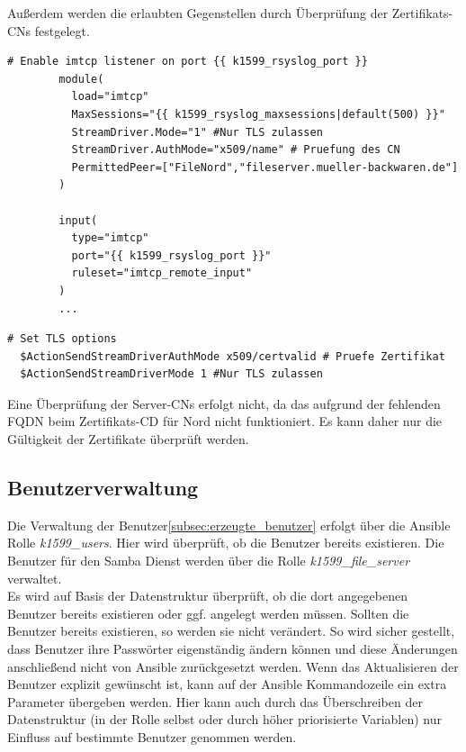 Außerdem werden die erlaubten Gegenstellen durch Überprüfung der Zertifikats-CNs festgelegt.

\begin{lstlisting}[label=code:syslog3,caption=Whitelisting der CN]
        # Enable imtcp listener on port {{ k1599_rsyslog_port }}
        module(
          load="imtcp"
          MaxSessions="{{ k1599_rsyslog_maxsessions|default(500) }}"
          StreamDriver.Mode="1" #Nur TLS zulassen
          StreamDriver.AuthMode="x509/name" # Pruefung des CN
          PermittedPeer=["FileNord","fileserver.mueller-backwaren.de"]
        )

        input(
          type="imtcp"
          port="{{ k1599_rsyslog_port }}"
          ruleset="imtcp_remote_input"
        )
        ...
\end{lstlisting}

\begin{lstlisting}[label=code:syslog4,caption=Clientseitige Prüfung in /etc/rsyslog.d/10\_imtcp\_remote\_output.conf.j2]
  # Set TLS options
  $ActionSendStreamDriverAuthMode x509/certvalid # Pruefe Zertifikat
  $ActionSendStreamDriverMode 1 #Nur TLS zulassen
\end{lstlisting}

Eine Überprüfung der Server-CNs erfolgt nicht, da das aufgrund der fehlenden FQDN beim Zertifikats-CD für Nord nicht funktioniert. Es kann daher nur die Gültigkeit der Zertifikate überprüft werden.

\subsection{Benutzerverwaltung}
Die Verwaltung der Benutzer\ref{subsec:erzeugte_benutzer} erfolgt über die Ansible Rolle \textit{k1599\_users}. Hier wird überprüft, ob die Benutzer bereits existieren. Die Benutzer für den Samba Dienst werden über die Rolle \textit{k1599\_file\_server} verwaltet. \\

Es wird auf Basis der Datenstruktur  überprüft, ob die dort angegebenen Benutzer bereits existieren oder ggf. angelegt werden müssen. Sollten die Benutzer bereits existieren, so werden sie nicht verändert. So wird sicher gestellt, dass Benutzer ihre Passwörter eigenständig ändern können und diese Änderungen anschließend nicht von Ansible zurückgesetzt werden. Wenn das Aktualisieren der Benutzer explizit gewünscht ist, kann auf der Ansible Kommandozeile ein extra Parameter  übergeben werden.  Hier kann auch durch das Überschreiben der Datenstruktur  (in der Rolle selbst oder durch höher priorisierte Variablen) nur Einfluss auf bestimmte Benutzer genommen werden.\\

